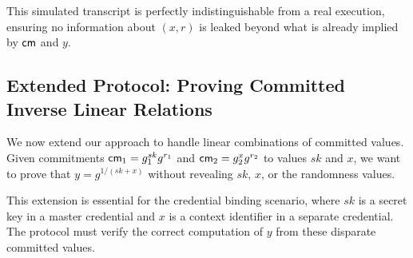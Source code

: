 This simulated transcript is perfectly indistinguishable from a real execution, ensuring no information about $(x, r)$ is leaked beyond what is already implied by $\mathsf{cm}$ and $y$.




















\subsection{Extended Protocol: Proving Committed Inverse Linear Relations}

We now extend our approach to handle linear combinations of committed values. Given commitments $\mathsf{cm}_1 = g_1^{sk} g^{r_1}$ and $\mathsf{cm}_2 = g_2^{x} g^{r_2}$ to values $sk$ and $x$, we want to prove that $y = g^{1/(sk + x)}$ without revealing $sk$, $x$, or the randomness values.

This extension is essential for the credential binding scenario, where $sk$ is a secret key in a master credential and $x$ is a context identifier in a separate credential. The protocol must verify the correct computation of $y$ from these disparate committed values.


